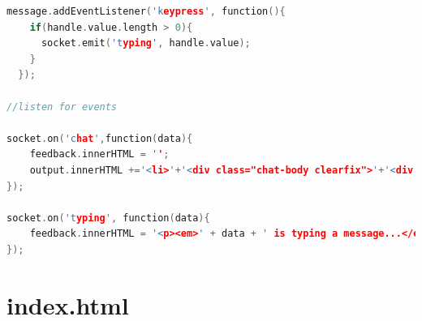 \documentclass{fisatproject}
\begin{document}
\begin{appendices}
\begin{lstlisting}[language=c++]
message.addEventListener('keypress', function(){
    if(handle.value.length > 0){
      socket.emit('typing', handle.value);
    }
  });

//listen for events

socket.on('chat',function(data){
    feedback.innerHTML = '';
    output.innerHTML +='<li>'+'<div class="chat-body clearfix">'+'<div class="header">'+'<small class=" text-muted">'+'<span class="glyphicon glyphicon-time">'+'</span>'+ date +'</small>'+' <strong class="pull-right primary-font">'+data.handle+'</strong>' +'</div>'+'<p>'+ data.message + '</p>'+'</div>'+'</li>';
});

socket.on('typing', function(data){
    feedback.innerHTML = '<p><em>' + data + ' is typing a message...</em></p>';
});

\end{lstlisting}
\newpage


\section{index.html}
\begin{lstlisting}[language=c++]



\end{lstlisting}
\end{appendices}
\end{document}
